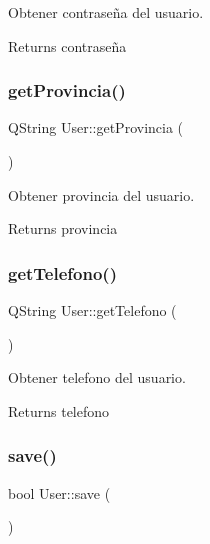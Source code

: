 Obtener contraseña del usuario. 

\begin{DoxyReturn}{Returns}
contraseña 
\end{DoxyReturn}
\mbox{\label{classUser_a539732e0d7d830e5027648c429c7d1ff}} 
\subsubsection{\texorpdfstring{get\+Provincia()}{getProvincia()}}
{\footnotesize\ttfamily Q\+String User\+::get\+Provincia (\begin{DoxyParamCaption}{ }\end{DoxyParamCaption})}



Obtener provincia del usuario. 

\begin{DoxyReturn}{Returns}
provincia 
\end{DoxyReturn}
\mbox{\label{classUser_a94361359fc402cecf21f3ac7189121d7}} 
\subsubsection{\texorpdfstring{get\+Telefono()}{getTelefono()}}
{\footnotesize\ttfamily Q\+String User\+::get\+Telefono (\begin{DoxyParamCaption}{ }\end{DoxyParamCaption})}



Obtener telefono del usuario. 

\begin{DoxyReturn}{Returns}
telefono 
\end{DoxyReturn}
\mbox{\label{classUser_a6bc3635e377a3d934379add410fcf9c0}} 
\subsubsection{\texorpdfstring{save()}{save()}}
{\footnotesize\ttfamily bool User\+::save (\begin{DoxyParamCaption}{ }\end{DoxyParamCaption})}



